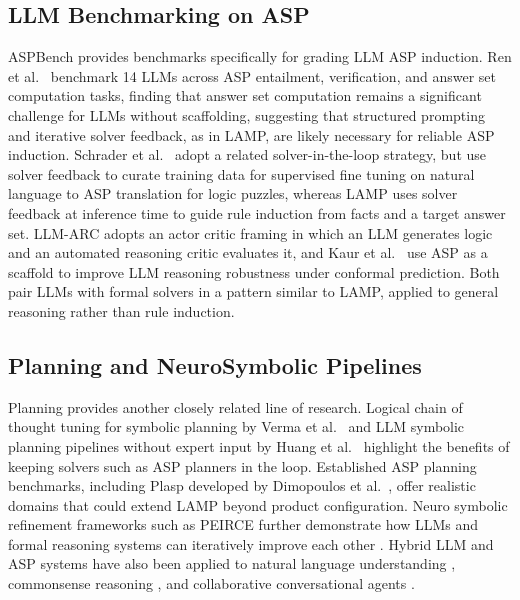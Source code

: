 \documentclass[11pt,a4paper]{article}
\begin{document}
\subsection{LLM Benchmarking on ASP}

ASPBench \cite{szeider2026aspbenchnaturallanguagelogic} provides benchmarks specifically for grading LLM ASP induction. Ren et al.~\cite{ren2025llmssolveaspproblems} benchmark 14 LLMs across ASP entailment, verification, and answer set computation tasks, finding that answer set computation remains a significant challenge for LLMs without scaffolding, suggesting that structured prompting and iterative solver feedback, as in LAMP, are likely necessary for reliable ASP induction. Schrader et al.~\cite{schrader2025solverintheloopframeworkimprovingllms} adopt a related solver-in-the-loop strategy, but use solver feedback to curate training data for supervised fine tuning on natural language to ASP translation for logic puzzles, whereas LAMP uses solver feedback at inference time to guide rule induction from facts and a target answer set. LLM-ARC \cite{kalyanpur2024llmarcenhancingllmsautomated} adopts an actor critic framing in which an LLM generates logic and an automated reasoning critic evaluates it, and Kaur et al.~\cite{kaur2025empiricalstudyconformalprediction} use ASP as a scaffold to improve LLM reasoning robustness under conformal prediction. Both pair LLMs with formal solvers in a pattern similar to LAMP, applied to general reasoning rather than rule induction.

\subsection{Planning and NeuroSymbolic Pipelines}

Planning provides another closely related line of research. Logical chain of thought tuning for symbolic planning by Verma et al.~\cite{verma2025teachingllmsplanlogical} and LLM symbolic planning pipelines without expert input by Huang et al.~\cite{huang2024planningdarkllmsymbolicplanning} highlight the benefits of keeping solvers such as ASP planners in the loop. Established ASP planning benchmarks, including Plasp developed by Dimopoulos et al.~\cite{dimopoulos2018plasp3effectiveasp}, offer realistic domains that could extend LAMP beyond product configuration. Neuro symbolic refinement frameworks such as PEIRCE further demonstrate how LLMs and formal reasoning systems can iteratively improve each other \cite{quan2025peirceunifyingmaterialformal}. Hybrid LLM and ASP systems have also been applied to natural language understanding \cite{rajasekharan2023reliablenaturallanguageunderstanding}, commonsense reasoning \cite{zeng2024reliablecommonsensereasoningsocialbot}, and collaborative conversational agents \cite{zeng2025reliablecollaborativeconversationalagent}.
\end{document}
